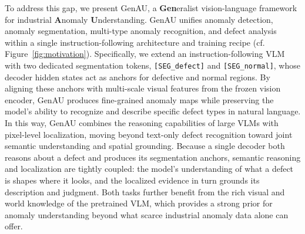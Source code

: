 To address this gap, we present GenAU, a \textbf{Gen}eralist vision-language framework for industrial \textbf{A}nomaly \textbf{U}nderstanding. GenAU unifies anomaly detection, anomaly segmentation, multi-type anomaly recognition, and defect analysis within a single instruction-following architecture and training recipe (cf. Figure~\ref{fig:motivation}). Specifically, we extend an instruction-following VLM with two dedicated segmentation tokens, \texttt{[SEG\_defect]} and \texttt{[SEG\_normal]}, whose decoder hidden states act as anchors for defective and normal regions. By aligning these anchors with multi-scale visual features from the frozen vision encoder, GenAU produces fine-grained anomaly maps while preserving the model’s ability to recognize and describe specific defect types in natural language. In this way, GenAU combines the reasoning capabilities of large VLMs with pixel-level localization, moving beyond text-only defect recognition toward joint semantic understanding and spatial grounding. 
Because a single decoder both reasons about a defect and produces its segmentation anchors, semantic reasoning and localization are tightly coupled: the model's understanding of what a defect is shapes where it looks, and the localized evidence in turn grounds its description and judgment. Both tasks further benefit from the rich visual and world knowledge of the pretrained VLM, which provides a strong prior for anomaly understanding beyond what scarce industrial anomaly data alone can offer.

